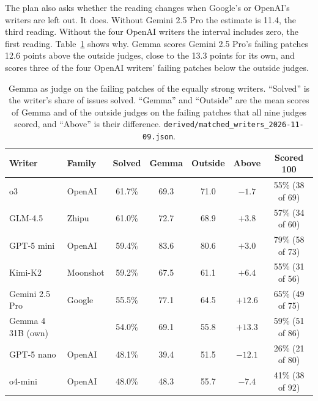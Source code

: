 \documentclass[10pt,letterpaper]{article}
\begin{document}
The plan also asks whether the reading changes when Google's or OpenAI's writers are left out. It does. Without Gemini
2.5 Pro the estimate is 11.4, the third reading. Without the four OpenAI writers the interval includes zero, the first
reading. Table~\ref{tab:equalwriters} shows why. Gemma scores Gemini 2.5 Pro's failing patches 12.6 points above the
outside judges, close to the 13.3 points for its own, and scores three of the four OpenAI writers' failing patches
below the outside judges.

\begin{table}[H]
\centering
\small
\caption{Gemma as judge on the failing patches of the equally strong writers. ``Solved'' is the writer's share of
issues solved. ``Gemma'' and ``Outside'' are the mean scores of Gemma and of the outside judges on the failing patches
that all nine judges scored, and ``Above'' is their difference. \texttt{derived/matched\_writers\_2026-11-09.json}.}
\label{tab:equalwriters}
\footnotesize
\begin{tabular}{@{}llccccc@{}}
\toprule
Writer & Family & Solved & Gemma & Outside & Above & Scored 100 \\
\midrule
o3 & OpenAI & 61.7\% & 69.3 & 71.0 & $-1.7$ & 55\% (38 of 69) \\
GLM-4.5 & Zhipu & 61.0\% & 72.7 & 68.9 & $+3.8$ & 57\% (34 of 60) \\
GPT-5 mini & OpenAI & 59.4\% & 83.6 & 80.6 & $+3.0$ & 79\% (58 of 73) \\
Kimi-K2 & Moonshot & 59.2\% & 67.5 & 61.1 & $+6.4$ & 55\% (31 of 56) \\
Gemini 2.5 Pro & Google & 55.5\% & 77.1 & 64.5 & $+12.6$ & 65\% (49 of 75) \\
Gemma 4 31B (own) & & 54.0\% & 69.1 & 55.8 & $+13.3$ & 59\% (51 of 86) \\
GPT-5 nano & OpenAI & 48.1\% & 39.4 & 51.5 & $-12.1$ & 26\% (21 of 80) \\
o4-mini & OpenAI & 48.0\% & 48.3 & 55.7 & $-7.4$ & 41\% (38 of 92) \\
\bottomrule
\end{tabular}
\end{table}
\end{document}
